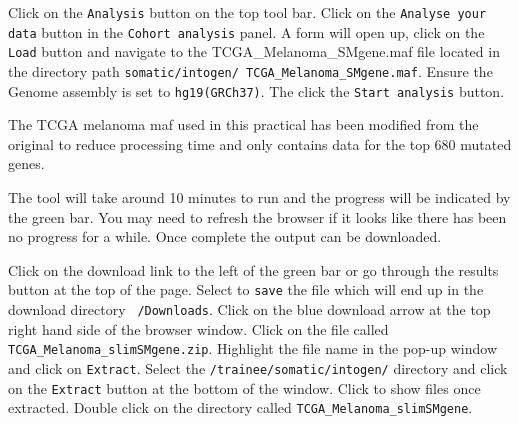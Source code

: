 \begin{steps}
Click on the \texttt{Analysis} button on the top tool bar. 
Click on the \texttt{Analyse your data} button in the \texttt{Cohort analysis} panel.
\vspace{4 mm]}
A form will open up, click on the \texttt{Load} button and navigate to the
TCGA\_Melanoma\_SMgene.maf file located in the directory path 
\texttt{somatic/intogen/ TCGA\_Melanoma\_SMgene.maf}.
\vspace{4 mm]}
Ensure the Genome assembly is set to \texttt{hg19(GRCh37)}.
\vspace{4 mm]}
The click the \texttt{Start analysis} button.
\end{steps}

\begin{note}
The TCGA melanoma maf used in this practical has been modified from the original
to reduce processing time and only contains data for the top 680 mutated genes.
\end{note}

\begin{information}
The tool will take around 10 minutes to run and the progress will be indicated
by the green bar. You may need to refresh the browser if it looks like there
has been no progress for a while.
\vspace{4 mm]}
Once complete the output can be downloaded.
\end{information}

\begin{steps}
Click on the download link to the left of the green bar or go through the
results button at the top of the page.
\vspace{4 mm]}
Select to \texttt{save} the file which will end up in the download
directory \texttt{~/Downloads}.
\vspace{4 mm]}
Click on the blue download arrow at the top right hand side of the browser window.
\vspace{4 mm]}
Click on the file called \texttt{TCGA\_Melanoma\_slimSMgene.zip}.
\vspace{4 mm]}
Highlight the file name in the pop-up window and click on \texttt{Extract}.
\vspace{4 mm]}
Select the \texttt{/trainee/somatic/intogen/} directory and click on the
\texttt{Extract} button at the bottom of the window.
\vspace{4 mm]}
Click to show files once extracted.
\vspace{4 mm]}
Double click on the directory called \texttt{TCGA\_Melanoma\_slimSMgene}.
\end{steps}

